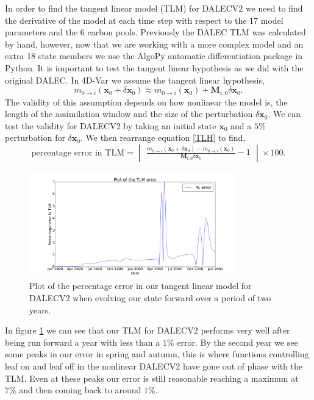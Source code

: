 \documentclass[11pt]{article}
\begin{document}
In order to find the tangent linear model (TLM) for DALECV2 we need to find the derivative of the model at each time step with respect to the 17 model parameters and the 6 carbon pools. Previously the DALEC TLM was calculated by hand, however, now that we are working with a more complex model and an extra 18 state members we use the AlgoPy automatic differentiation package in Python. It is important to test the tangent linear hypothesis as we did with the original DALEC. In 4D-Var we assume the tangent linear hypothesis,
\begin{equation}
m_{0\rightarrow i}(\mathbf{x}_0+\delta\mathbf{x}_0) \approx m_{0 \rightarrow i}(\mathbf{x}_0) + \mathbf{M}_{i,0}\delta\mathbf{x}_0. \label{TLH}
\end{equation}
The validity of this assumption depends on how nonlinear the model is, the length of the assimilation window and the size of the perturbation $\delta\mathbf{x}_0$. We can test the validity for DALECV2 by taking an initial state $\mathbf{x}_0$ and a $5\%$ perturbation for $\delta\mathbf{x}_0$. We then rearrange equation \ref{TLH} to find, 
\begin{equation}
\text{percentage error in TLM} = \begin{vmatrix} \frac{m_{0\rightarrow i}(\mathbf{x}_0+\delta\mathbf{x}_0) - m_{0 \rightarrow i}(\mathbf{x}_0)}{ \mathbf{M}_{i,0}\delta\mathbf{x}_0} - 1 \end{vmatrix} \times 100.
\end{equation}

\begin{figure}[ht]
    \centering
    \includegraphics[width=0.8\textwidth]{tlm_error.png}
    \caption{Plot of the percentage error in our tangent linear model for DALECV2 when evolving our state forward over a period of two years.}
    \label{fig:tlm_error}
\end{figure}

In figure \ref{fig:tlm_error} we can see that our TLM for DALECV2 performs very well after being run forward a year with less than a $1\%$ error. By the second year we see some peaks in our error in spring and autumn, this is where functions controlling leaf on and leaf off in the nonlinear DALECV2 have gone out of phase with the TLM. Even at these peaks our error is still reasonable reaching a maximum at $7\%$ and then coming back to around $1\%$. 
\end{document}
